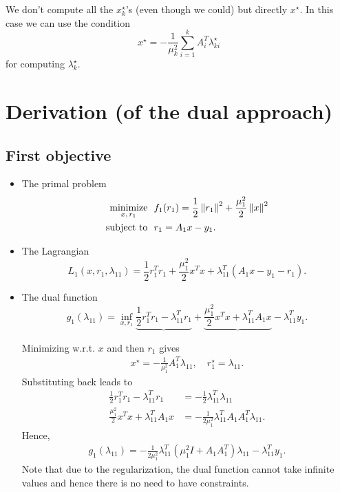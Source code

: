 \documentclass[12pt]{article}
\begin{document}
We don't compute all the $x_k^{\star}$'s (even though we could) but directly $x^{\star}$. In this
case we can use the condition
%
\[
x^{\star} = -\frac{1}{\mu_k^2}\sum_{i=1}^{k}A_i^T\lambda_{ki}^{\star}
\]
%
for computing $\lambda_{k}^{\star}$.

\newpage

\section{Derivation (of the dual approach)}

\subsection{First objective}

\begin{itemize}

\item The primal problem
  \begin{align}
    \begin{split}
      \mathop{\mbox{minimize}}_{x, \, r_1} \ \  & f_1(r_1) = \frac{1}{2}\left\lVert r_1\right\rVert^2 + \frac{\mu_1^2}{2}\left\lVert x\right\rVert^2\\
      \mbox{subject to} \ \  & r_1 = A_1x - y_1.
    \end{split}
  \end{align}

\item The Lagrangian
  \[
  L_1(x,r_1,\lambda_{11}) = \frac{1}{2}r_1^Tr_1 + \frac{\mu_1^2}{2} x^Tx + \lambda_{11}^T(A_1x - y_1 - r_1).
  \]

\item The dual function
%
\[
g_1(\lambda_{11}) = \inf_{x,r_1} \underbrace{\frac{1}{2}r_1^Tr_1 - \lambda_{11}^Tr_1} +
\underbrace{\frac{\mu_1^2}{2}x^Tx + \lambda_{11}^TA_1x} - \lambda_{11}^Ty_1.
\]

Minimizing w.r.t. $x$ and then $r_1$ gives
%
\begin{align} \label{eq.x_r}
x^{\star} = -\frac{1}{\mu_1^2}A_1^T\lambda_{11}, \quad r_1^{\star} = \lambda_{11}.
\end{align}
%
Substituting back leads to
%
\begin{align}
\frac{1}{2}r_1^Tr_1 - \lambda_{11}^Tr_1 &= -\frac{1}{2}\lambda_{11}^T\lambda_{11} \\
\frac{\mu_1^2}{2} x^Tx + \lambda_{11}^TA_1x &= -\frac{1}{2\mu_1^2} \lambda_{11}^T A_1A_1^T \lambda_{11}.
\end{align}
%
Hence,
%
\begin{align}
g_1(\lambda_{11}) = -\frac{1}{2\mu_1^2}\lambda_{11}^T\left(\mu_1^2I+A_1A_1^T\right)\lambda_{11} - \lambda_{11}^Ty_1.
\end{align}
%
Note that due to the regularization, the dual function cannot take infinite values and hence there
is no need to have constraints.


\end{itemize}
\end{document}
